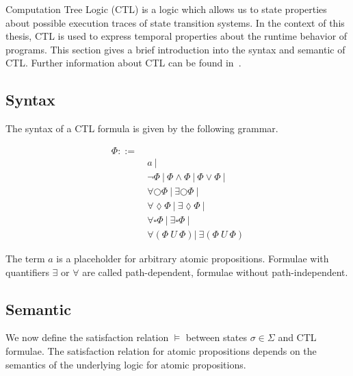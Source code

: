 \documentclass[11pt,a4paper,titlepage]{article}
\theoremstyle{definition}
\begin{document}
Computation Tree Logic (CTL) is a logic which allows us to state properties about possible execution traces of state transition systems. 
In the context of this thesis, CTL is used to express temporal properties about the runtime behavior of programs. 
This section gives a brief introduction into the syntax and semantic of CTL. 
Further information about CTL can be found in~\cite{baier2008principles}.

\subsection{Syntax}
The syntax of a CTL formula is given by the following grammar.

\begin{align*}
    \Phi  ::= \ & \\ 
    & a \ | \\
    & \neg \Phi \ | \ \Phi \land \Phi \ | \ \Phi \lor \Phi \ | \\
    & \forall\bigcirc\Phi \ | \ \exists\bigcirc\Phi \ | \\
    & \forall\lozenge\Phi \ | \ \exists\lozenge\Phi \ | \\
    & \forall\square\Phi \ | \ \exists\square\Phi \ | \\
    & \forall(\Phi \ U \ \Phi) | \ \exists(\Phi \ U \ \Phi) 
\end{align*}

The term $a$ is a placeholder for arbitrary atomic propositions. Formulae with quantifiers $\exists$ or $\forall$ are called
path-dependent, formulae without path-independent.

\subsection{Semantic}

We now define the satisfaction relation $\models$ between states $\sigma \in \Sigma$ and CTL formulae.
The satisfaction relation for atomic propositions depends on the semantics of the underlying 
logic for atomic propositions.
\end{document}
